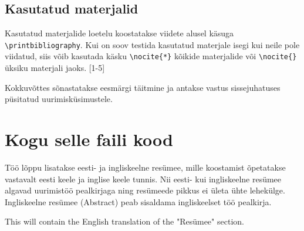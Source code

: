 \documentclass{trkut}%
\begin{document}
\section{Kasutatud materjalid}
Kasutatud materjalide loetelu koostatakse viidete alusel käsuga \verb!\printbibliography!. Kui on soov testida kasutatud materjale isegi kui neile pole viidatud, siis võib kasutada käsku \verb!\nocite{*}! kõikide materjalide või \verb!\nocite{}! üksiku materjali jaoks. \cite{palma15}[1-5]


Kokkuvõttes sõnastatakse eesmärgi täitmine ja antakse vastus sissejuhatuses püsitatud uurimisküsimustele.

\nocite{*}
\printbibliography

\appendix

\chapter{Kogu selle faili kood}
\tiny

\normalsize

\appendixend

Töö lõppu lisatakse eesti- ja ingliskeelne resümee, mille koostamist õpetatakse vastavalt eesti keele ja inglise keele tunnis. Nii eesti- kui ingliskeelne resümee algavad uurimistöö pealkirjaga ning resümeede pikkus ei ületa ühte lehekülge. Ingliskeelne resümee (Abstract) peab sisaldama ingliskeelset töö pealkirja.


This will contain the English translation of the "Resümee" section.

\kinnitusleht
\end{document}
